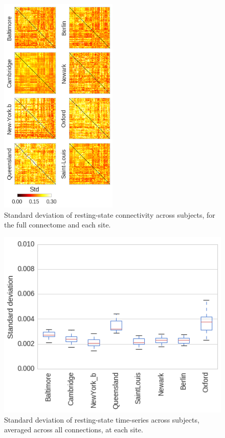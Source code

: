 \documentclass[authoryear]{elsarticle}
\begin{document}
\begin{figure}[htbp]
\centering
\includegraphics[width=0.50\textwidth]{../figures/connectome_std_multisite2.png}
\caption[]{
Standard deviation of resting-state connectivity across subjects, for the full connectome and each site.
}
\label{fig_std_connectomes}
\end{figure}



\begin{figure}[htbp]
\begin{center}
\includegraphics[width=0.75\linewidth]{../figures/multisite_std_distribution.png}
\end{center}
\caption[]{
Standard deviation of resting-state time-series across subjects, averaged across all connections, at each site.
}
\label{fig_std_ts_distribution}
\end{figure}
\end{document}
